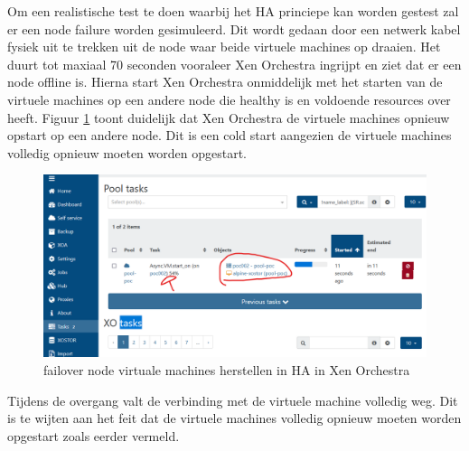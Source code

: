 Om een realistische test te doen waarbij het HA princiepe kan worden gestest zal er een node failure worden gesimuleerd.
Dit wordt gedaan door een netwerk kabel fysiek uit te trekken uit de node waar beide virtuele machines op draaien.
Het duurt tot maxiaal 70 seconden vooraleer Xen Orchestra ingrijpt en ziet dat er een node offline is. Hierna start Xen Orchestra onmiddelijk met het starten van de virtuele machines op een andere node die healthy is en voldoende resources over heeft.
Figuur \ref{fig:failure-orch} toont duidelijk dat Xen Orchestra de virtuele machines opnieuw opstart op een andere node. Dit is een cold start aangezien de virtuele machines volledig opnieuw moeten worden opgestart.
\begin{figure}[H]
  \centering
  \includegraphics[width=1.1\textwidth, trim=0cm 0cm 5cm 0cm, clip]{../poc/failure-orch.png}
  \caption{failover node virtuale machines herstellen in HA in Xen Orchestra}
  \label{fig:failure-orch}    
\end{figure}
Tijdens de overgang valt de verbinding met de virtuele machine volledig weg. Dit is te wijten aan het feit dat de virtuele machines volledig opnieuw moeten worden opgestart zoals eerder vermeld.

